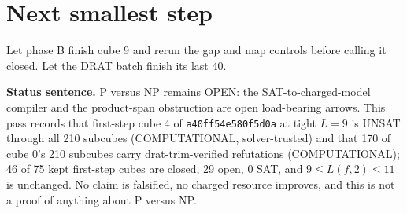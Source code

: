 \documentclass[11pt]{article}
\begin{document}
\section*{Next smallest step}
Let phase B finish cube 9 and rerun the gap and map controls before calling it closed. Let the DRAT batch finish its last 40.

\bigskip
\noindent\textbf{Status sentence.} P versus NP remains OPEN: the SAT-to-charged-model compiler and the product-span obstruction are open load-bearing arrows. This pass records that first-step cube 4 of \texttt{a40ff54e580f5d0a} at tight $L=9$ is UNSAT through all 210 subcubes (COMPUTATIONAL, solver-trusted) and that 170 of cube 0's 210 subcubes carry drat-trim-verified refutations (COMPUTATIONAL); 46 of 75 kept first-step cubes are closed, 29 open, 0 SAT, and $9\le L(f,2)\le 11$ is unchanged. No claim is falsified, no charged resource improves, and this is not a proof of anything about P versus NP.
\end{document}
